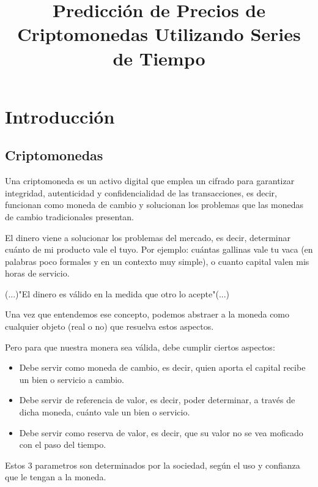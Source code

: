 \documentclass[a4paper,10pt]{article}
\title{Predicción de Precios de Criptomonedas Utilizando Series de Tiempo}
\author{}
\begin{document}
\maketitle

\begin{abstract}

\end{abstract}

\tableofcontents


\section{Introducción}

\subsection{Criptomonedas}

 Una criptomoneda es un activo digital que emplea un cifrado para garantizar integridad, autenticidad y confidencialidad de las transacciones, es decir, funcionan como moneda de cambio y solucionan los problemas que las monedas de cambio tradicionales presentan.

 El dinero viene a solucionar los problemas del mercado, es decir, determinar cuánto de mi producto vale el tuyo. Por ejemplo: cuántas gallinas vale tu vaca (en palabras poco formales y en un contexto muy simple), o cuanto capital valen mis horas de servicio.

(...)"El dinero es válido en la medida que otro lo acepte"(...)

Una vez que entendemos ese concepto, podemos abstraer a la moneda como cualquier objeto (real o no) que resuelva estos aspectos.

Pero para que nuestra monera sea válida, debe cumplir ciertos aspectos:

\begin{itemize}
 \item Debe servir como moneda de cambio, es decir, quien aporta el capital recibe un bien o servicio a cambio.
 \item Debe servir de referencia de valor, es decir, poder determinar, a través de dicha moneda, cuánto vale un bien o servicio.
 \item Debe servir como reserva de valor, es decir, que su valor no se vea moficado con el paso del tiempo.
\end{itemize}

Estos 3 parametros son determinados por la sociedad, según el uso y confianza que le tengan a la moneda.
\end{document}
